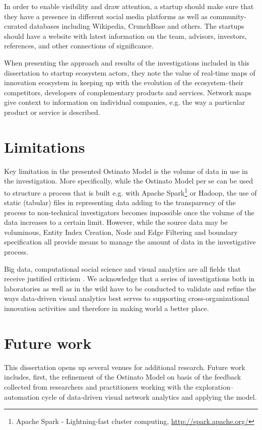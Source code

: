 In order to enable visibility and draw attention, a startup should make sure that they have a presence in different social media platforms as well as community-curated databases including Wikipedia, CrunchBase and others. The startups should have a website with latest information on the team, advisors, investors, references, and other connections of significance. 

When presenting the approach and results of the investigations included in this dissertation to startup ecosystem actors, they note the value of real-time maps of innovation ecosystem in keeping up with the evolution of the ecosystem--their competitors, developers of complementary products and services. Network maps give context to information on individual companies, e.g. the way a particular product or service is described. 

\section{Limitations}

Key limitation in the presented Ostinato Model is the volume of data in use in the investigation. More specifically, while the Ostinato Model per se can be used to structure a process that is built e.g. with Apache Spark\footnote{Apache Spark - Lightning-fast cluster computing, \url{http://spark.apache.org/}} or Hadoop, the use of static (tabular) files in representing data adding to the transparency of the process to non-technical investigators becomes impossible once the volume of the data increases to a certain limit. However, while the source data may be voluminous, Entity Index Creation, Node and Edge Filtering and boundary specification all provide means to manage the amount of data in the investigative process.

Big data, computational social science and visual analytics are all fields that receive justified criticism \citep[cf.][]{boyd2012CriticalData}. We acknowledge that a series of investigations both in laboratories as well as in the wild have to be conducted to validate and refine the ways data-driven visual analytics best serves to supporting cross-organizational innovation activities and therefore in making world a better place.

\section{Future work}

This dissertation opens up several venues for additional research. Future work includes, first, the refinement of the Ostinato Model on basis of the feedback collected from researchers and practitioners working with the exploration–automation cycle of data-driven visual network analytics and applying the model.

